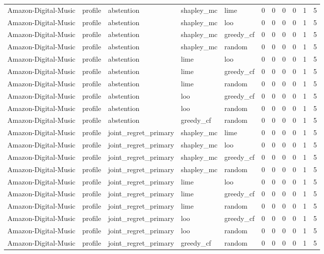 \begin{table}[t]
{\begin{tabular}{lllllrrrrrr}
Amazon-Digital-Music & profile & abstention & shapley\_mc & lime & 0 & 0 & 0 & 0 & 1 & 5 \\
Amazon-Digital-Music & profile & abstention & shapley\_mc & loo & 0 & 0 & 0 & 0 & 1 & 5 \\
Amazon-Digital-Music & profile & abstention & shapley\_mc & greedy\_cf & 0 & 0 & 0 & 0 & 1 & 5 \\
Amazon-Digital-Music & profile & abstention & shapley\_mc & random & 0 & 0 & 0 & 0 & 1 & 5 \\
Amazon-Digital-Music & profile & abstention & lime & loo & 0 & 0 & 0 & 0 & 1 & 5 \\
Amazon-Digital-Music & profile & abstention & lime & greedy\_cf & 0 & 0 & 0 & 0 & 1 & 5 \\
Amazon-Digital-Music & profile & abstention & lime & random & 0 & 0 & 0 & 0 & 1 & 5 \\
Amazon-Digital-Music & profile & abstention & loo & greedy\_cf & 0 & 0 & 0 & 0 & 1 & 5 \\
Amazon-Digital-Music & profile & abstention & loo & random & 0 & 0 & 0 & 0 & 1 & 5 \\
Amazon-Digital-Music & profile & abstention & greedy\_cf & random & 0 & 0 & 0 & 0 & 1 & 5 \\
Amazon-Digital-Music & profile & joint\_regret\_primary & shapley\_mc & lime & 0 & 0 & 0 & 0 & 1 & 5 \\
Amazon-Digital-Music & profile & joint\_regret\_primary & shapley\_mc & loo & 0 & 0 & 0 & 0 & 1 & 5 \\
Amazon-Digital-Music & profile & joint\_regret\_primary & shapley\_mc & greedy\_cf & 0 & 0 & 0 & 0 & 1 & 5 \\
Amazon-Digital-Music & profile & joint\_regret\_primary & shapley\_mc & random & 0 & 0 & 0 & 0 & 1 & 5 \\
Amazon-Digital-Music & profile & joint\_regret\_primary & lime & loo & 0 & 0 & 0 & 0 & 1 & 5 \\
Amazon-Digital-Music & profile & joint\_regret\_primary & lime & greedy\_cf & 0 & 0 & 0 & 0 & 1 & 5 \\
Amazon-Digital-Music & profile & joint\_regret\_primary & lime & random & 0 & 0 & 0 & 0 & 1 & 5 \\
Amazon-Digital-Music & profile & joint\_regret\_primary & loo & greedy\_cf & 0 & 0 & 0 & 0 & 1 & 5 \\
Amazon-Digital-Music & profile & joint\_regret\_primary & loo & random & 0 & 0 & 0 & 0 & 1 & 5 \\
Amazon-Digital-Music & profile & joint\_regret\_primary & greedy\_cf & random & 0 & 0 & 0 & 0 & 1 & 5 \\

\end{tabular}}
\end{table}
